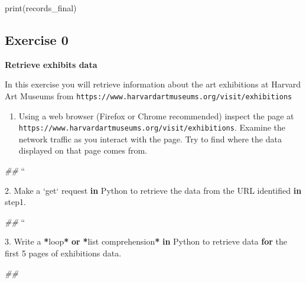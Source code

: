\documentclass[
]{book}
\newenvironment{Shaded}{\begin{snugshade}}{\end{snugshade}}
\newcommand{\BuiltInTok}[1]{#1}
\newcommand{\CommentTok}[1]{\textcolor[rgb]{0.56,0.35,0.01}{\textit{#1}}}
\newcommand{\ControlFlowTok}[1]{\textcolor[rgb]{0.13,0.29,0.53}{\textbf{#1}}}
\newcommand{\DecValTok}[1]{\textcolor[rgb]{0.00,0.00,0.81}{#1}}
\newcommand{\FloatTok}[1]{\textcolor[rgb]{0.00,0.00,0.81}{#1}}
\newcommand{\ImportTok}[1]{#1}
\newcommand{\KeywordTok}[1]{\textcolor[rgb]{0.13,0.29,0.53}{\textbf{#1}}}
\newcommand{\NormalTok}[1]{#1}
\newcommand{\OperatorTok}[1]{\textcolor[rgb]{0.81,0.36,0.00}{\textbf{#1}}}
\providecommand{\tightlist}{%
  \setlength{\itemsep}{0pt}\setlength{\parskip}{0pt}}
\begin{document}
\begin{Shaded}
\begin{Highlighting}[]
\BuiltInTok{print}\NormalTok{(records_final)}
\end{Highlighting}
\end{Shaded}

\hypertarget{exercise-0-4}{%
\subsection{Exercise 0}\label{exercise-0-4}}

\textbf{Retrieve exhibits data}

In this exercise you will retrieve information about the art
exhibitions at Harvard Art Museums from
\texttt{https://www.harvardartmuseums.org/visit/exhibitions}

\begin{enumerate}
\def\labelenumi{\arabic{enumi}.}
\tightlist
\item
  Using a web browser (Firefox or Chrome recommended) inspect the
  page at \texttt{https://www.harvardartmuseums.org/visit/exhibitions}. Examine
  the network traffic as you interact with the page. Try to find
  where the data displayed on that page comes from.
\end{enumerate}

\begin{Shaded}
\begin{Highlighting}[]
\CommentTok{##}
\NormalTok{``}

\FloatTok{2.}\NormalTok{ Make a `get` request }\KeywordTok{in}\NormalTok{ Python to retrieve the data }\ImportTok{from}\NormalTok{ the URL}
\NormalTok{   identified }\KeywordTok{in}\NormalTok{ step1.}
\end{Highlighting}
\end{Shaded}

\begin{Shaded}
\begin{Highlighting}[]
\CommentTok{##}
\NormalTok{``}

\FloatTok{3.}\NormalTok{ Write a }\OperatorTok{*}\NormalTok{loop}\OperatorTok{*} \KeywordTok{or} \OperatorTok{*}\BuiltInTok{list}\NormalTok{ comprehension}\OperatorTok{*} \KeywordTok{in}\NormalTok{ Python to retrieve data}
   \ControlFlowTok{for}\NormalTok{ the first }\DecValTok{5}\NormalTok{ pages of exhibitions data.}
\end{Highlighting}
\end{Shaded}

\begin{Shaded}
\begin{Highlighting}[]
\CommentTok{##}
\end{Highlighting}
\end{Shaded}
\end{document}
